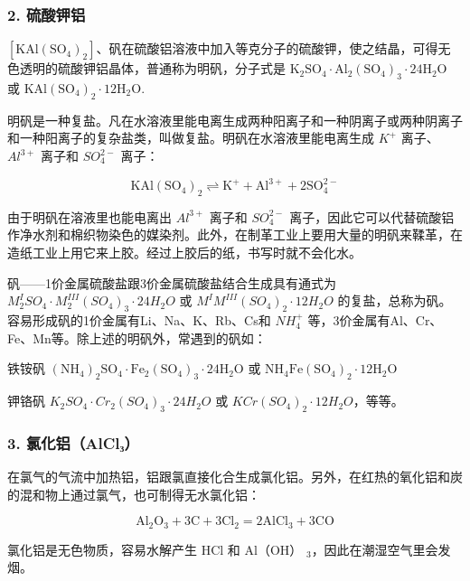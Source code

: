 \subsubsection{2. 硫酸钾铝}

\(\left[\mathrm{KAl}\left(\mathrm{SO}_{4}\right)_{2}\right]\)、矾在硫酸铝溶液中加入等克分子的硫酸钾，使之结晶，可得无色透明的硫酸钾铝晶体，普通称为明矾，分子式是
\(\mathrm{K}_{2} \mathrm{SO}_{4} \cdot \mathrm{Al}_{2}\left(\mathrm{SO}_{4}\right)_{3} \cdot 24 \mathrm{H}_{2} \mathrm{O}\)
或
\(\mathrm{KAl}\left(\mathrm{SO}_{4}\right)_{2} \cdot 12 \mathrm{H}_{2} \mathrm{O}\).

明矾是一种复盐。凡在水溶液里能电离生成两种阳离子和一种阴离子或两种阴离子和一种阳离子的复杂盐类，叫做复盐。明矾在水溶液里能电离生成
\(K^{+}\) 离子、\(Al^{3+}\) 离子和 \(SO_{4}^{2-}\) 离子：

\[
\mathrm{KAl} \left(\mathrm{SO} _ {4}\right) _ {2} \rightleftharpoons \mathrm{K} ^ {+} + \mathrm{Al} ^{3+} + 2 \mathrm{SO} _ {4}^{2-}
\]

由于明矾在溶液里也能电离出 \(Al^{3+}\) 离子和 \(SO_{4}^{2-}\)
离子，因此它可以代替硫酸铝作净水剂和棉织物染色的媒染剂。此外，在制革工业上要用大量的明矾来鞣革，在造纸工业上用它来上胶。经过上胶后的纸，书写时就不会化水。

矾------1价金属硫酸盐跟3价金属硫酸盐结合生成具有通式为
\(M_{2}^{I}SO_{4}\cdot M_{2}^{III}(SO_{4})_{3}\cdot24H_{2}O\) 或
\(M^{I}M^{III}(SO_{4})_{2}\cdot12H_{2}O\)
的复盐，总称为矾。容易形成矾的1价金属有Li、Na、K、Rb、Cs和
\(NH_{4}^{+}\)
等，3价金属有Al、Cr、Fe、Mn等。除上述的明矾外，常遇到的矾如：

铁铵矾
\((\mathrm{NH}_{4})_{2}\mathrm{SO}_{4}\cdot\mathrm{Fe}_{2}(\mathrm{SO}_{4})_{3}\cdot24\mathrm{H}_{2}\mathrm{O}\)
或
\(\mathrm{NH}_{4}\mathrm{Fe}(\mathrm{SO}_{4})_{2}\cdot12\mathrm{H}_{2}\mathrm{O}\)

钾铬矾 \(K_{2}SO_{4}\cdot Cr_{2}(SO_{4})_{3}\cdot24H_{2}O\) 或
\(KCr(SO_{4})_{2}\cdot12H_{2}O\)，等等。

\subsubsection{3. 氯化铝（AlCl₃）}

在氯气的气流中加热铝，铝跟氯直接化合生成氯化铝。另外，在红热的氧化铝和炭的混和物上通过氯气，也可制得无水氯化铝：

\[
\mathrm{Al} _ {2} \mathrm{O} _ {3} + 3 \mathrm{C} + 3 \mathrm{Cl} _ {2} = 2 \mathrm{AlCl} _ {3} + 3 \mathrm{CO}
\]

氯化铝是无色物质，容易水解产生 HCl 和 Al（OH）
\(_{3}\)，因此在潮湿空气里会发烟。

